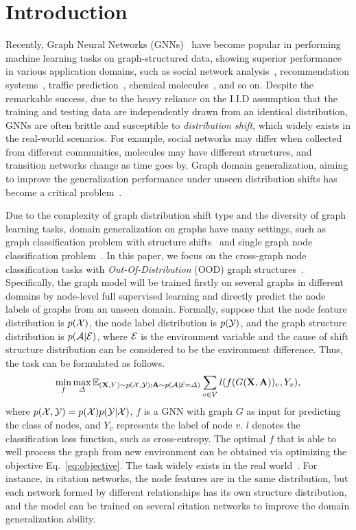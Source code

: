 \section{Introduction}
Recently, Graph Neural Networks (GNNs)~\cite{kipf2017semi} have become popular in performing machine learning tasks on graph-structured data, showing superior performance in various application domains, such as social network analysis~\cite{kipf2017semi},
recommendation systems~\cite{wu2022graph}, traffic prediction~\cite{jiang2022graph}, chemical molecules~\cite{yang2019analyzing,zhang2022fine}, and so on.
Despite the remarkable success, due to the heavy reliance on the I.I.D assumption that the training and testing data are independently drawn from an identical distribution\cite{pan2010survey}, GNNs are often brittle and susceptible to \textit{distribution shift}, which widely exists in the real-world scenarios. For example, social networks may differ when collected from different communities, molecules may have different structures, and transition networks change as time goes by. Graph domain generalization, aiming to improve the generalization performance under unseen distribution shifts has become a critical problem~\cite{li2022out}.

Due to the complexity of graph distribution shift type and the diversity of graph learning tasks, domain generalization on graphs have many settings, such as graph classification problem with structure shifts~\cite{chen2022invariance} and single graph node classification problem~\cite{yu2022finding}.
In this paper, we focus on the cross-graph node classification tasks with \textit{Out-Of-Distribution} (OOD) graph structures~\cite{wuhandling}.
Specifically, the graph model will  be trained firstly on several graphs in different domains  by node-level full supervised learning and directly predict the node labels of graphs from an unseen domain. Formally, suppose that the node feature distribution is $p(\mathcal{X})$, the node label distribution is $p(\mathcal{Y})$, and the graph structure distribution is $p(\mathcal{A}| \mathcal{E} )$, where $\mathcal{E}$ is the environment variable and the cause of shift structure distribution can be considered to be
the environment difference.
Thus, the task can be formulated as follows.
\begin{align}
\label{eq:objective}
    \mathop{\min}_{f} \mathop{\max}_{\varDelta } \mathbb{E}_{(\mathbf{X},Y)\sim p(\mathcal{X},\mathcal{Y});\mathbf{A} \sim p(\mathcal{A}| \mathcal{E} = \varDelta)} \sum_{v\in V} l(f(G(\mathbf{X}, \mathbf{A}))_v, Y_v),
\end{align}
where  $p(\mathcal{X},\mathcal{Y})=p(\mathcal{X})p(\mathcal{Y} | \mathcal{X})$, $f$ is a GNN with graph $G$ as input for predicting the class of nodes, and $Y_v$ represents the label of node $v$. $l$ denotes the classification loss function, such as cross-entropy.
The optimal $f$ that is able to well process the graph from new environment can be obtained via  optimizing  the objective Eq.~\eqref{eq:objective}. The task widely exists in the real world~\cite{wuhandling}.
For instance, in citation networks, the node features are in the same distribution, but each network formed by different relationships has its own structure distribution, and the model can be trained on  several citation networks to improve the domain generalization ability. 

